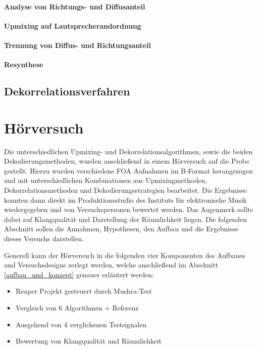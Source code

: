 \documentclass[12pt, a4paper]{article}
\begin{document}
        \paragraph{Analyse von Richtungs- und Diffusanteil}
        
        \paragraph{Upmixing auf Lautsprecherandordnung}
        
        \paragraph{Trennung von Diffus- und Richtungsanteil}
        
        \paragraph{Resynthese}
        

    \subsection{Dekorrelationsverfahren} \label{dekorrelation}
    

\newpage

\section{Hörversuch}
Die unterschiedlichen Upmixing- und Dekorrelationsalgorithmen, sowie die beiden Dekodierungsmethoden, wurden anschließend in einem Hörversuch auf die Probe gestellt. Hierzu wurden verschiedene FOA Aufnahmen im B-Format herangezogen und mit unterschiedlichen Kombinationen aus Upmixingmethoden, Dekorrelationsmethoden und Dekodierungsstrategien bearbeitet. Die Ergebnisse konnten dann direkt im Produktionsstudio des Instituts für elektronische Musik wiedergegeben und von Versuchspersonen bewertet werden. Das Augenmerk sollte dabei auf Klangqualität und Darstellung der Räumlichkeit liegen. Die folgenden Abschnitt sollen die Annahmen, Hypothesen, den Aufbau und die Ergebnisse dieses Versuchs darstellen.

Generell kann der Hörversuch in die folgenden vier Komponenten des Aufbaues und Versuchsdesigns zerlegt werden, welche anschließend im Abschnitt \ref{aufbau_und_konzept} genauer erläutert werden:
\begin{itemize}
    \item Reaper Projekt gesteuert durch Mushra-Test
    \item Vergleich von 6 Algorithmen + Referenz
    \item Ausgehend von 4 verglichenen Testsignalen
    \item Bewertung von Klangqualität und Räumlichkeit
\end{itemize}
\end{document}

